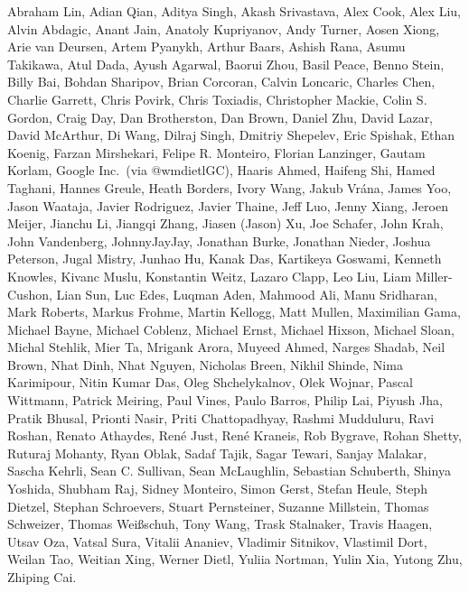 Abraham Lin,
Adian Qian,
Aditya Singh,
Akash Srivastava,
Alex Cook,
Alex Liu,
Alvin Abdagic,
Anant Jain,
Anatoly Kupriyanov,
Andy Turner,
Aosen Xiong,
Arie van Deursen,
Artem Pyanykh,
Arthur Baars,
Ashish Rana,
Asumu Takikawa,
Atul Dada,
Ayush Agarwal,
Baorui Zhou,
Basil Peace,
Benno Stein,
Billy Bai,
Bohdan Sharipov,
Brian Corcoran,
Calvin Loncaric,
Charles Chen,
Charlie Garrett,
Chris Povirk,
Chris Toxiadis,
Christopher Mackie,
Colin S. Gordon,
Craig Day,
Dan Brotherston,
Dan Brown,
Daniel Zhu,
David Lazar,
David McArthur,
Di Wang,
Dilraj Singh,
Dmitriy Shepelev,
Eric Spishak,
Ethan Koenig,
Farzan Mirshekari,
Felipe R. Monteiro,
Florian Lanzinger,
Gautam Korlam,
Google Inc.\ (via @wmdietlGC),
Haaris Ahmed,
Haifeng Shi,
Hamed Taghani,
Hannes Greule,
Heath Borders,
Ivory Wang,
Jakub Vr\'ana,
James Yoo,
Jason Waataja,
Javier Rodriguez,
Javier Thaine,
Jeff Luo,
Jenny Xiang,
Jeroen Meijer,
Jianchu Li,
Jiangqi Zhang,
Jiasen (Jason) Xu,
Joe Schafer,
John Krah,
John Vandenberg,
JohnnyJayJay,
Jonathan Burke,
Jonathan Nieder,
Joshua Peterson,
Jugal Mistry,
Junhao Hu,
Kanak Das,
Kartikeya Goswami,
Kenneth Knowles,
Kivanc Muslu,
Konstantin Weitz,
Lazaro Clapp,
Leo Liu,
Liam Miller-Cushon,
Lian Sun,
Luc Edes,
Luqman Aden,
Mahmood Ali,
Manu Sridharan,
Mark Roberts,
Markus Frohme,
Martin Kellogg,
Matt Mullen,
Maximilian Gama,
Michael Bayne,
Michael Coblenz,
Michael Ernst,
Michael Hixson,
Michael Sloan,
Michal Stehlik,
Mier Ta,
Mrigank Arora,
Muyeed Ahmed,
Narges Shadab,
Neil Brown,
Nhat Dinh,
Nhat Nguyen,
Nicholas Breen,
Nikhil Shinde,
Nima Karimipour,
Nitin Kumar Das,
Oleg Shchelykalnov,
Olek Wojnar,
Pascal Wittmann,
Patrick Meiring,
Paul Vines,
Paulo Barros,
Philip Lai,
Piyush Jha,
Pratik Bhusal,
Prionti Nasir,
Priti Chattopadhyay,
Rashmi Mudduluru,
Ravi Roshan,
Renato Athaydes,
Ren\'e Just,
Ren\'e Kraneis,
Rob Bygrave,
Rohan Shetty,
Ruturaj Mohanty,
Ryan Oblak,
Sadaf Tajik,
Sagar Tewari,
Sanjay Malakar,
Sascha Kehrli,
Sean C. Sullivan,
Sean McLaughlin,
Sebastian Schuberth,
Shinya Yoshida,
Shubham Raj,
Sidney Monteiro,
Simon Gerst,
Stefan Heule,
Steph Dietzel,
Stephan Schroevers,
Stuart Pernsteiner,
Suzanne Millstein,
Thomas Schweizer,
Thomas Wei\ss schuh,
Tony Wang,
Trask Stalnaker,
Travis Haagen,
Utsav Oza,
Vatsal Sura,
Vitalii Ananiev,
Vladimir Sitnikov,
Vlastimil Dort,
Weilan Tao,
Weitian Xing,
Werner Dietl,
Yuliia Nortman,
Yulin Xia,
Yutong Zhu,
Zhiping Cai.
